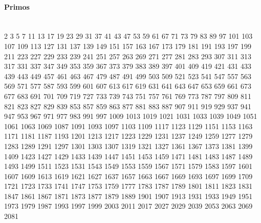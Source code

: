 \paragraph{Primos} \ \\
2 3 5 7 11 13 17 19 23 29
31 37 41 43 47 53 59 61 67 71
73 79 83 89 97 101 103 107 109 113
127 131 137 139 149 151 157 163 167 173
179 181 191 193 197 199 211 223 227 229
233 239 241 251 257 263 269 271 277 281
283 293 307 311 313 317 331 337 347 349
353 359 367 373 379 383 389 397 401 409
419 421 431 433 439 443 449 457 461 463
467 479 487 491 499 503 509 521 523 541
547 557 563 569 571 577 587 593 599 601
607 613 617 619 631 641 643 647 653 659
661 673 677 683 691 701 709 719 727 733
739 743 751 757 761 769 773 787 797 809
811 821 823 827 829 839 853 857 859 863
877 881 883 887 907 911 919 929 937 941
947 953 967 971 977 983 991 997 1009 1013
1019 1021 1031 1033 1039 1049 1051 1061 1063 1069
1087 1091 1093 1097 1103 1109 1117 1123 1129 1151
1153 1163 1171 1181 1187 1193 1201 1213 1217 1223
1229 1231 1237 1249 1259 1277 1279 1283 1289 1291
1297 1301 1303 1307 1319 1321 1327 1361 1367 1373
1381 1399 1409 1423 1427 1429 1433 1439 1447 1451
1453 1459 1471 1481 1483 1487 1489 1493 1499 1511
1523 1531 1543 1549 1553 1559 1567 1571 1579 1583
1597 1601 1607 1609 1613 1619 1621 1627 1637 1657
1663 1667 1669 1693 1697 1699 1709 1721 1723 1733
1741 1747 1753 1759 1777 1783 1787 1789 1801 1811
1823 1831 1847 1861 1867 1871 1873 1877 1879 1889
1901 1907 1913 1931 1933 1949 1951 1973 1979 1987
1993 1997 1999 2003 2011 2017 2027 2029 2039 2053
2063 2069 2081
 
